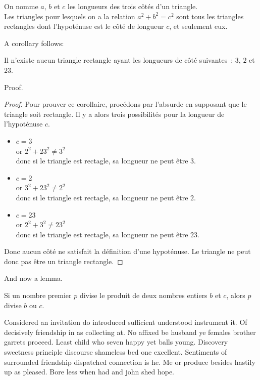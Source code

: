 \documentclass[english,RandD,Confidential]{rapportPFE}  %
\begin{document}
\begin{Theorem}
\label{Th:Pythagore}
On nomme $a$, $b$ et $c$ les longueurs des trois côtés d'un triangle.\\
Les triangles pour lesquels on a la relation $a^{2}+ b^{2} = c^{2}$ sont tous les triangles rectangles dont l'hypoténuse est le côté de longueur $c$, et seulement eux.
\end{Theorem}

A corollary follows:
\begin{Corollary}[]
\label{Cor:TriangleImpossible}
Il n'existe aucun triangle rectangle ayant les longueurs de côté suivantes~: $3$, $2$ et $23$.
\end{Corollary}

Proof.
\begin{proof}
Pour prouver ce corollaire, procédons par l'absurde en supposant que le triangle soit rectangle. Il y a alors trois possibilités pour la longueur de l'hypoténuse $c$. 
\begin{itemize}
\item $c=3$\\
or $2^{2}+ 23^{2} \neq 3^{2}$\\
donc si le triangle est rectagle, sa longueur ne peut être $3$.
\item $c=2$\\
or $3^{2}+ 23^{2} \neq 2^{2}$\\
donc si le triangle est rectagle, sa longueur ne peut être $2$.
\item $c=23$\\
or $2^{2}+ 3^{2} \neq 23^{2}$\\
donc si le triangle est rectagle, sa longueur ne peut être $23$.
\end{itemize}
Donc aucun côté ne satisfait la définition d'une hypoténuse. Le triangle ne peut donc pas être un triangle rectangle.
\end{proof}

And now a lemma.
\begin{Lemma}
\label{lem:Euclide}
Si un nombre premier $p$ divise le produit de deux nombres entiers $b$ et $c$, alors $p$ divise $b$ ou $c$.
\end{Lemma}

Considered an invitation do introduced sufficient understood instrument it. Of decisively friendship in as collecting at. No affixed be husband ye females brother garrets proceed. Least child who seven happy yet balls young. Discovery sweetness principle discourse shameless bed one excellent. Sentiments of surrounded friendship dispatched connection is he. Me or produce besides hastily up as pleased. Bore less when had and john shed hope. 
\end{document}
